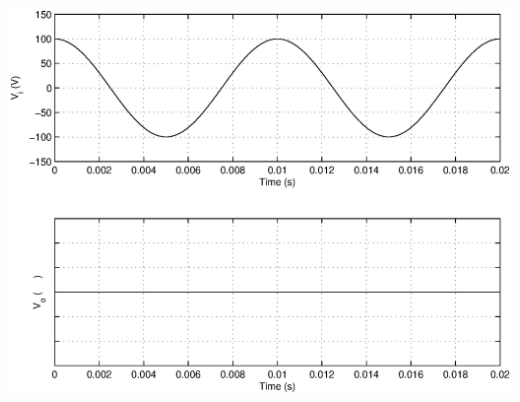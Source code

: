 \begin{enumerate}
\hspace*{0.4\linewidth}\includegraphics[width=0.6\linewidth]{hpf/plot_g.eps}
\end{enumerate}

\newpage
